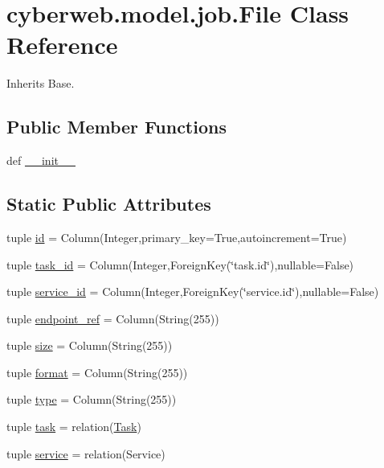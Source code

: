 \hypertarget{classcyberweb_1_1model_1_1job_1_1_file}{\section{cyberweb.\-model.\-job.\-File \-Class \-Reference}
\label{classcyberweb_1_1model_1_1job_1_1_file}
}


\-Inherits \-Base.

\subsection*{\-Public \-Member \-Functions}
\begin{DoxyCompactItemize}
\item 
def \hyperlink{classcyberweb_1_1model_1_1job_1_1_file_a0693ec870c45bd4c979665c14e584927}{\-\_\-\-\_\-init\-\_\-\-\_\-}
\end{DoxyCompactItemize}
\subsection*{\-Static \-Public \-Attributes}
\begin{DoxyCompactItemize}
\item 
tuple \hyperlink{classcyberweb_1_1model_1_1job_1_1_file_ac470f316fdbba692bad0b8ea0f6d756a}{id} = \-Column(\-Integer,primary\-\_\-key=\-True,autoincrement=\-True)
\item 
tuple \hyperlink{classcyberweb_1_1model_1_1job_1_1_file_a79185602853ec81864ade6f5a58384d0}{task\-\_\-id} = \-Column(\-Integer,\-Foreign\-Key(\char`\"{}task.\-id\char`\"{}),nullable=\-False)
\item 
tuple \hyperlink{classcyberweb_1_1model_1_1job_1_1_file_a0301a658dbd9fd867ab5fb889336c6be}{service\-\_\-id} = \-Column(\-Integer,\-Foreign\-Key(\char`\"{}service.\-id\char`\"{}),nullable=\-False)
\item 
tuple \hyperlink{classcyberweb_1_1model_1_1job_1_1_file_a6d0fae156bd6295c007be75da2f6bf38}{endpoint\-\_\-ref} = \-Column(\-String(255))
\item 
tuple \hyperlink{classcyberweb_1_1model_1_1job_1_1_file_aae96f7b15acb5ffe444de5d4fc834184}{size} = \-Column(\-String(255))
\item 
tuple \hyperlink{classcyberweb_1_1model_1_1job_1_1_file_a418553bb8f4f82a639c52381e43463aa}{format} = \-Column(\-String(255))
\item 
tuple \hyperlink{classcyberweb_1_1model_1_1job_1_1_file_ac7e6ef419642dcd23db3fc3b1646a5b2}{type} = \-Column(\-String(255))
\item 
tuple \hyperlink{classcyberweb_1_1model_1_1job_1_1_file_ab713777dd38678c1850a1360cf76115a}{task} = relation(\hyperlink{classcyberweb_1_1model_1_1job_1_1_task}{\-Task})
\item 
tuple \hyperlink{classcyberweb_1_1model_1_1job_1_1_file_af9f74a90be41957ce9f09f86c6981fd7}{service} = relation(\-Service)
\end{DoxyCompactItemize}


